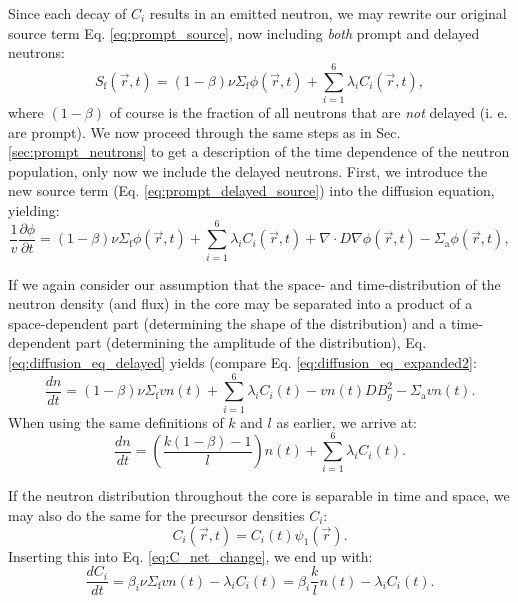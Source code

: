 Since each decay of $C_i$ results in an emitted neutron, we may rewrite our original source term Eq. \ref{eq:prompt_source}, now including \emph{both} prompt and delayed neutrons:
\begin{equation}
	S_\text{f}(\vec{r}, t) = (1-\beta) \nu \Sigma_\text{f}\phi(\vec{r}, t) + \sum_{i=1}^6 \lambda_i C_i(\vec{r}, t),
	\label{eq:prompt_delayed_source}
\end{equation}
where $(1-\beta)$ of course is the fraction of all neutrons that are \emph{not} delayed (i. e. are prompt). We now proceed through the same steps as in Sec. \ref{sec:prompt_neutrons} to get a description of the time dependence of the neutron population, only now we include the delayed neutrons. First, we introduce the new source term (Eq. \ref{eq:prompt_delayed_source}) into the diffusion equation, yielding:
\begin{equation}
	\frac{1}{v}\frac{\partial \phi}{\partial t} = (1-\beta) \nu \Sigma_\text{f}\phi(\vec{r}, t) + \sum_{i=1}^6 \lambda_i C_i(\vec{r}, t) + \nabla \cdot D\nabla \phi(\vec{r}, t) - \Sigma_\text{a}\phi(\vec{r}, t),
	\label{eq:diffusion_eq_delayed}
\end{equation}

If we again consider our assumption that the space- and time-distribution of the neutron density (and flux) in the core may be separated into a product of a space-dependent part (determining the shape of the distribution) and a time-dependent part (determining the amplitude of the distribution), Eq. \ref{eq:diffusion_eq_delayed} yields (compare Eq. \ref{eq:diffusion_eq_expanded2}:
\begin{equation}
	\frac{d n}{d t} = (1-\beta) \nu \Sigma_\text{f} v n(t) + \sum_{i=1}^6 \lambda_i C_i(t) - v n(t) D B_g^2 - \Sigma_\text{a}v n(t).
	\label{eq:diffusion_eq_delayed_expanded2}
\end{equation}
When using the same definitions of $k$ and $l$ as earlier, we arrive at:
\begin{equation}
	\frac{dn}{dt} = \left( \frac{k(1 - \beta) - 1}{l} \right) n(t) + \sum_{i=1}^6 \lambda_i C_i(t).
	\label{eq:diffusion_eq_delayed_expanded3}
\end{equation}

If the neutron distribution throughout the core is separable in time and space, we may also do the same for the precursor densities $C_i$:
\begin{equation}
	C_i(\vec{r}, t) = C_i(t) \psi_1(\vec{r}).
\end{equation}
Inserting this into Eq. \ref{eq:C_net_change}, we end up with:
\begin{equation}
	\frac{d C_i}{d t} = \beta_i \nu \Sigma_\text{f} v n(t) - \lambda_i C_i(t) = \beta_i \frac{k}{l} n(t) - \lambda_i C_i(t).
	\label{eq:C_change}
\end{equation}

